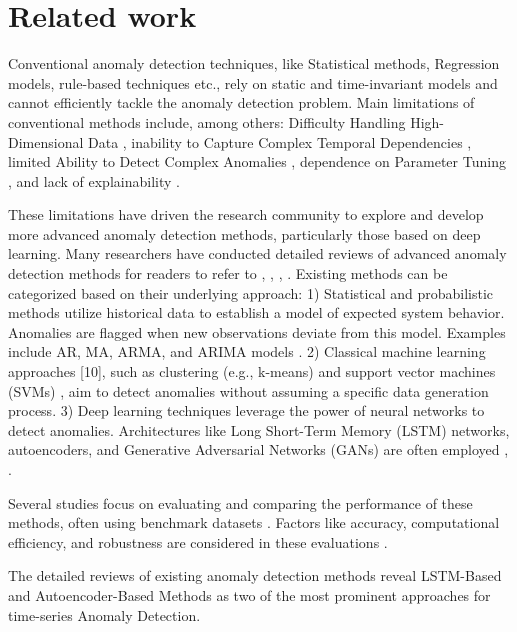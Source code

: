 \documentclass[conference]{IEEEtran}
\begin{document}
\section{Related work}
\label{sec:bg}

Conventional anomaly detection techniques, like Statistical methods, Regression models, rule-based techniques etc., rely on static and time-invariant models and cannot efficiently tackle the anomaly detection problem. Main limitations of conventional methods include, among others: Difficulty Handling High-Dimensional Data \cite{s23052844}, inability to Capture Complex Temporal Dependencies \cite{8926446}, limited Ability to Detect Complex Anomalies \cite{DBLP:journals/corr/abs-2004-00433}, dependence on Parameter Tuning \cite{s23052844}, and lack of explainability \cite{HILAL2022116429}.

These limitations have driven the research community to explore and develop more advanced anomaly detection methods, particularly those based on deep learning. Many researchers have conducted detailed reviews of advanced anomaly detection methods for readers to refer to \cite{8926446}, \cite{9523565}, \cite{10.14778/3538598.3538602}, \cite{MEJRI2024124922}. Existing methods can be categorized based on their underlying approach: 1) Statistical and probabilistic methods \cite{SGUEGLIA2022170} utilize historical data to establish a model of expected system behavior. Anomalies are flagged when new observations deviate from this model. Examples include AR, MA, ARMA, and ARIMA models \cite{10.1145/3444690}. 2) Classical machine learning approaches [10], such as clustering (e.g., k-means) and support vector machines (SVMs) \cite{9523565}, aim to detect anomalies without assuming a specific data generation process. 3) Deep learning techniques \cite{8079887} leverage the power of neural networks to detect anomalies. Architectures like Long Short-Term Memory (LSTM) networks, autoencoders, and Generative Adversarial Networks (GANs) are often employed \cite{8926446}, \cite{10.14778/3538598.3538602}.

Several studies focus on evaluating and comparing the performance of these methods, often using benchmark datasets \cite{MEJRI2024124922}. Factors like accuracy, computational efficiency, and robustness are considered in these evaluations \cite{DBLP:journals/corr/abs-2004-00433}.

The detailed reviews of existing anomaly detection methods reveal LSTM-Based and Autoencoder-Based Methods as two of the most prominent approaches for time-series Anomaly Detection.  
\end{document}
